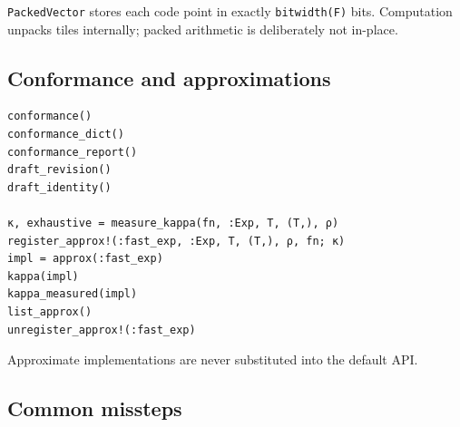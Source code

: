 \texttt{PackedVector} stores each code point in exactly \texttt{bitwidth(F)} bits. Computation unpacks tiles internally; packed arithmetic is deliberately not in-place.



\subsection{Conformance and approximations}



\label{9146403741965371237}{}



\begin{verbatim}
conformance()
conformance_dict()
conformance_report()
draft_revision()
draft_identity()

κ, exhaustive = measure_kappa(fn, :Exp, T, (T,), ρ)
register_approx!(:fast_exp, :Exp, T, (T,), ρ, fn; κ)
impl = approx(:fast_exp)
kappa(impl)
kappa_measured(impl)
list_approx()
unregister_approx!(:fast_exp)
\end{verbatim}



Approximate implementations are never substituted into the default API.



\subsection{Common missteps}



\label{17066561505140199306}{}



